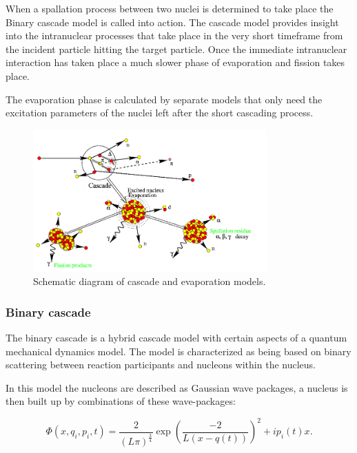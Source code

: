 When a spallation process between two nuclei is determined to take place the Binary cascade model is called into action. The cascade model provides insight into the intranuclear processes that take place in the very short timeframe from the incident particle hitting the target particle. Once the immediate intranuclear interaction has taken place a much slower phase of evaporation and fission takes place. 

The evaporation phase is calculated by separate models that only need the excitation parameters of the nuclei left after the short cascading process.

\begin{figure}[h]
\begin{center}
\includegraphics[width=0.8\textwidth]{images/inclScematic.png}  
\caption{\label{fig:inclschematic} Schematic diagram of cascade and evaporation models.}
 
 \end{center}
 \end{figure}

\subsubsection{Binary cascade}
The binary cascade is a hybrid cascade model with certain aspects of a quantum mechanical dynamics model. The model is characterized as being based on binary scattering between reaction participants and nucleons within the nucleus.

In this model the nucleons are described as Gaussian wave packages, a nucleus is then built up by combinations of these wave-packages:


\begin{equation}
\Phi(x,q_i,p_i,t) = \frac{2}{(L\pi)^{\frac{3}{4}}}\exp{(\frac{-2}{L(x - q(t))})^2+ip_i(t)x}.
\label{wavePackage}
\end{equation}


